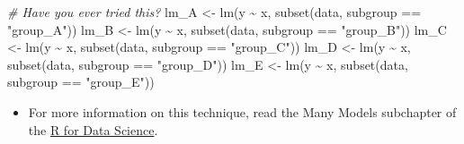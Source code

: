 \documentclass[
]{book}
\newenvironment{Shaded}{\begin{snugshade}}{\end{snugshade}}
\newcommand{\AttributeTok}[1]{\textcolor[rgb]{0.77,0.63,0.00}{#1}}
\newcommand{\CommentTok}[1]{\textcolor[rgb]{0.56,0.35,0.01}{\textit{#1}}}
\newcommand{\ControlFlowTok}[1]{\textcolor[rgb]{0.13,0.29,0.53}{\textbf{#1}}}
\newcommand{\DecValTok}[1]{\textcolor[rgb]{0.00,0.00,0.81}{#1}}
\newcommand{\FunctionTok}[1]{\textcolor[rgb]{0.00,0.00,0.00}{#1}}
\newcommand{\NormalTok}[1]{#1}
\newcommand{\OtherTok}[1]{\textcolor[rgb]{0.56,0.35,0.01}{#1}}
\newcommand{\SpecialCharTok}[1]{\textcolor[rgb]{0.00,0.00,0.00}{#1}}
\newcommand{\StringTok}[1]{\textcolor[rgb]{0.31,0.60,0.02}{#1}}
\providecommand{\tightlist}{%
  \setlength{\itemsep}{0pt}\setlength{\parskip}{0pt}}
\begin{document}
\begin{Shaded}
\begin{Highlighting}[]
\CommentTok{\# Have you ever tried this?}
\NormalTok{lm\_A }\OtherTok{\textless{}{-}} \FunctionTok{lm}\NormalTok{(y }\SpecialCharTok{\textasciitilde{}}\NormalTok{ x, }\FunctionTok{subset}\NormalTok{(data, subgroup }\SpecialCharTok{==} \StringTok{"group\_A"}\NormalTok{))}
\NormalTok{lm\_B }\OtherTok{\textless{}{-}} \FunctionTok{lm}\NormalTok{(y }\SpecialCharTok{\textasciitilde{}}\NormalTok{ x, }\FunctionTok{subset}\NormalTok{(data, subgroup }\SpecialCharTok{==} \StringTok{"group\_B"}\NormalTok{))}
\NormalTok{lm\_C }\OtherTok{\textless{}{-}} \FunctionTok{lm}\NormalTok{(y }\SpecialCharTok{\textasciitilde{}}\NormalTok{ x, }\FunctionTok{subset}\NormalTok{(data, subgroup }\SpecialCharTok{==} \StringTok{"group\_C"}\NormalTok{))}
\NormalTok{lm\_D }\OtherTok{\textless{}{-}} \FunctionTok{lm}\NormalTok{(y }\SpecialCharTok{\textasciitilde{}}\NormalTok{ x, }\FunctionTok{subset}\NormalTok{(data, subgroup }\SpecialCharTok{==} \StringTok{"group\_D"}\NormalTok{))}
\NormalTok{lm\_E }\OtherTok{\textless{}{-}} \FunctionTok{lm}\NormalTok{(y }\SpecialCharTok{\textasciitilde{}}\NormalTok{ x, }\FunctionTok{subset}\NormalTok{(data, subgroup }\SpecialCharTok{==} \StringTok{"group\_E"}\NormalTok{))}
\end{Highlighting}
\end{Shaded}

\begin{itemize}
\tightlist
\item
  For more information on this technique, read the Many Models subchapter of the \href{https://r4ds.had.co.nz/many-models.html\#creating-list-columns}{R for Data Science}.
\end{itemize}

\begin{Shaded}
\end{Shaded}
\end{document}
